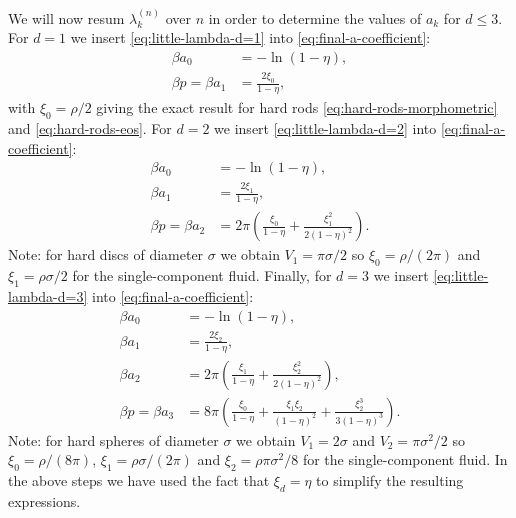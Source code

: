 \documentclass[11pt,twoside]{report}
\def\includebibliography{}
\begin{document}
We will now resum $\lambda_k^{(n)}$ over $n$ in order to determine the values of $a_k$ for $d \le 3$.
For $d=1$ we insert \eqref{eq:little-lambda-d=1} into \eqref{eq:final-a-coefficient}:
\begin{subequations}
  \begin{align}
    \beta a_0
    &= - \ln{(1 - \eta)},
    \\
    \beta p =
    \beta a_1 &=
    \frac{2 \xi_0}{1-\eta},
  \end{align}
\end{subequations}
with $\xi_0 = \rho / 2$ giving the exact result for hard rods \eqref{eq:hard-rods-morphometric} and \eqref{eq:hard-rods-eos}.
For $d=2$ we insert \eqref{eq:little-lambda-d=2} into \eqref{eq:final-a-coefficient}:
\begin{subequations}
  \begin{align}
    \beta a_0 &= -\ln{(1 - \eta)},
    \\
    \beta a_1 &= \frac{2 \xi_1}{1-\eta},
    \\
    \beta p =
    \beta a_2 &=
    2\pi \left(
    \frac{\xi_0}{1-\eta}
    + \frac{\xi_1^2}{2(1-\eta)^2}
    \right).
  \end{align}
\end{subequations}
Note: for hard discs of diameter $\sigma$ we obtain $V_1 = \pi \sigma / 2$ so $\xi_0 = \rho / (2\pi)$ and $\xi_1 = \rho \sigma / 2$ for the single-component fluid.
Finally, for $d=3$ we insert \eqref{eq:little-lambda-d=3} into \eqref{eq:final-a-coefficient}:
\begin{subequations}
  \begin{align}
    \beta a_0 &= -\ln{(1 - \eta)},
    \\
    \beta a_1 &= \frac{2 \xi_2}{1-\eta},
    \\
    \beta a_2 &=
    2 \pi
    \left(
    \frac{\xi_1}{1-\eta}
    + \frac{\xi_2^2}{2(1-\eta)^2}
    \right),
    \\
    \beta p =
    \beta a_3 &=
    8 \pi\left(
    \frac{\xi_0}{1-\eta}
    + \frac{\xi_1 \xi_2}{(1-\eta)^2}
    + \frac{\xi_2^3}{3 (1-\eta)^3}
    \right).
    \label{eq:a3-d=3}
  \end{align}
\end{subequations}
Note: for hard spheres of diameter $\sigma$ we obtain $V_1 = 2\sigma$ and $V_2 = \pi \sigma^2 / 2$ so $\xi_0 = \rho / (8\pi)$, $\xi_1 = \rho \sigma / (2\pi)$ and $\xi_2 = \rho \pi \sigma^2 / 8$ for the single-component fluid.
In the above steps we have used the fact that $\xi_d = \eta$ to simplify the resulting expressions.

\ifdefined\includebibliography
  \printbibliography
\fi
\end{document}
